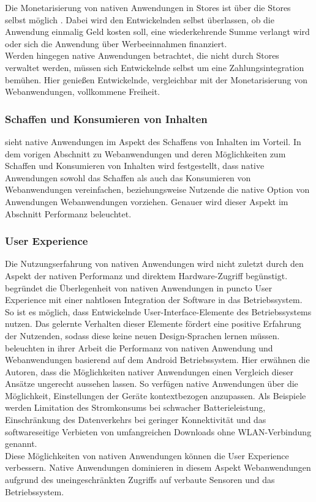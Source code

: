 \documentclass[a4paper]{scrartcl}
\begin{document}
Die Monetarisierung von nativen Anwendungen in Stores ist über die Stores selbst möglich \autocite{Appstore_Connect}. Dabei wird den Entwickelnden selbst überlassen, ob die Anwendung einmalig Geld kosten soll, eine wiederkehrende Summe verlangt wird oder sich die Anwendung über Werbeeinnahmen finanziert. \\
Werden hingegen native Anwendungen betrachtet, die nicht durch Stores verwaltet werden, müssen sich Entwickelnde selbst um eine Zahlungsintegration bemühen. Hier genießen Entwickelnde, vergleichbar mit der Monetarisierung von Webanwendungen, vollkommene Freiheit.


\subsubsection{Schaffen und Konsumieren von Inhalten}

\textcite[28]{Jobe} sieht native Anwendungen im Aspekt des Schaffens von Inhalten im Vorteil. In dem vorigen Abschnitt zu Webanwendungen und deren Möglichkeiten zum Schaffen und Konsumieren von Inhalten wird festgestellt, dass native Anwendungen sowohl das Schaffen als auch das Konsumieren von Webanwendungen vereinfachen, beziehungsweise Nutzende die native Option von Anwendungen Webanwendungen vorziehen. Genauer wird dieser Aspekt im Abschnitt Performanz beleuchtet.


\subsubsection{User Experience}

Die Nutzungserfahrung von nativen Anwendungen wird nicht zuletzt durch den Aspekt der nativen Performanz und direktem Hardware-Zugriff begünstigt. \textcite[28]{Jobe} begründet die Überlegenheit von nativen Anwendungen in puncto User Experience mit einer nahtlosen Integration der Software in das Betriebssystem. So ist es möglich, dass Entwickelnde User-Interface-Elemente des Betriebssystems nutzen. Das gelernte Verhalten dieser Elemente fördert eine positive Erfahrung der Nutzenden, sodass diese keine neuen Design-Sprachen lernen müssen. \\
\textcite[1001]{native_vs_web} beleuchten in ihrer Arbeit die Performanz von nativen Anwendung und Webanwendungen basierend auf dem Android Betriebssystem. Hier erwähnen die Autoren, dass die Möglichkeiten nativer Anwendungen einen Vergleich dieser Ansätze ungerecht aussehen lassen. So verfügen native Anwendungen über die Möglichkeit, Einstellungen der Geräte kontextbezogen anzupassen. Als Beispiele werden Limitation des Stromkonsums bei schwacher Batterieleistung, Einschränkung des Datenverkehrs bei geringer Konnektivität und das softwareseitige Verbieten von umfangreichen Downloads ohne WLAN-Verbindung genannt. \\
Diese Möglichkeiten von nativen Anwendungen können die User Experience verbessern. Native Anwendungen dominieren in diesem Aspekt Webanwendungen aufgrund des uneingeschränkten Zugriffs auf verbaute Sensoren und das Betriebssystem.
\end{document}
